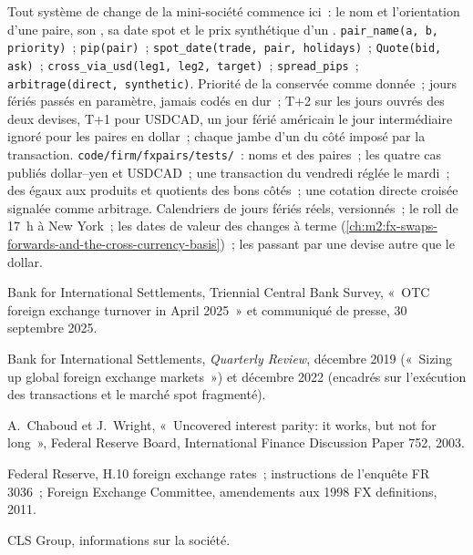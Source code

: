 \begin{build}
 Tout système de change de la mini-société commence ici~: le nom
et l'orientation d'une paire, son , sa date spot et le prix synthétique
d'un .
 \texttt{pair\_name(a, b, priority)}~; \texttt{pip(pair)}~;
\texttt{spot\_date(trade, pair, holidays)}~; \texttt{Quote(bid, ask)}~;
\texttt{cross\_via\_usd(leg1, leg2, target)}~; \texttt{spread\_pips}~;
\texttt{arbitrage(direct, synthetic)}.
 Priorité de la  conservée comme donnée~; jours fériés passés en paramètre, jamais
codés en dur~; T+2 sur les jours ouvrés des deux devises, T+1 pour USDCAD, un jour férié américain le
jour intermédiaire ignoré pour les paires en dollar~; chaque jambe d'un  du côté imposé par la
transaction.
 \texttt{code/firm/fxpairs/tests/}~: noms et  des paires~;
les quatre cas publiés dollar--yen et USDCAD~; une transaction du vendredi réglée le
mardi~; des  égaux aux produits et quotients des bons côtés~; une
cotation directe croisée signalée comme arbitrage.
 Calendriers de jours fériés réels, versionnés~; le roll de 17~h à New York~;
les dates de valeur des changes à terme (\cref{ch:m2:fx-swaps-forwards-and-the-cross-currency-basis})~; les  passant par une devise autre que le dollar.
\end{build}

\begin{omsources}
\item Bank for International Settlements, Triennial Central Bank Survey,
«~OTC foreign exchange turnover in April 2025~» et communiqué de presse, 30 septembre
2025.
\item Bank for International Settlements, \emph{Quarterly Review}, décembre 2019
(«~Sizing up global foreign exchange markets~») et décembre 2022 (encadrés sur
l'exécution des transactions et le marché spot fragmenté).
\item A.~Chaboud et J.~Wright, «~Uncovered interest parity: it works, but not
for long~», Federal Reserve Board, International Finance Discussion Paper 752,
2003.
\item Federal Reserve, H.10 foreign exchange rates~; instructions de l'enquête FR 3036~;
Foreign Exchange Committee, amendements aux 1998 FX
definitions, 2011.
\item CLS Group, informations sur la société.
\end{omsources}

